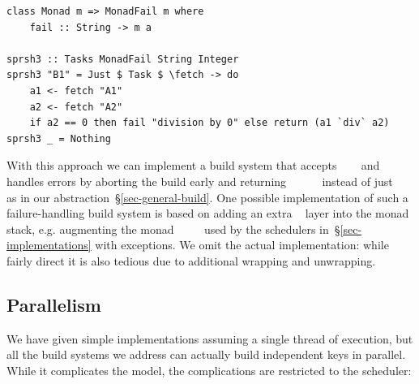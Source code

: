 \vspace{1mm}
\begin{verbatim}
class Monad m => MonadFail m where
    fail :: String -> m a

sprsh3 :: Tasks MonadFail String Integer
sprsh3 "B1" = Just $ Task $ \fetch -> do
    a1 <- fetch "A1"
    a2 <- fetch "A2"
    if a2 == 0 then fail "division by 0" else return (a1 `div` a2)
sprsh3 _ = Nothing
\end{verbatim}
\vspace{1mm}

\noindent
With this approach we can implement a build system that accepts
~~~ and handles errors by aborting the
build early and returning
~~~~~ instead of just
~~~ as in our 
abstraction~\S\ref{sec-general-build}. One possible implementation of such a
failure-handling build system is based on adding an extra
~ layer into the monad stack, e.g. augmenting the monad
~~~~ used by the schedulers
in~\S\ref{sec-implementations} with exceptions. We omit the actual
implementation: while fairly direct it is also tedious due to additional
wrapping and unwrapping.


\subsection{Parallelism}\label{sec-parallelism}

We have given simple implementations assuming a single thread of execution,
but all the build systems we address can actually build independent keys in
parallel. While it complicates the model, the complications are restricted
to the scheduler:

